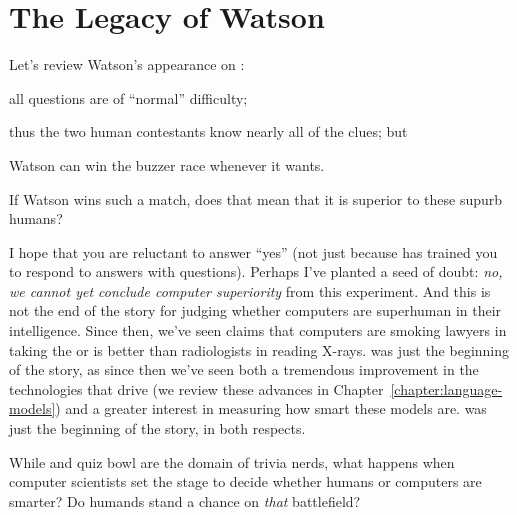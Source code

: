 
\section{The Legacy of Watson}


Let's review Watson's appearance on \jeopardy{}:
\begin{enumerate*}
        \item all questions are of ``normal'' difficulty;
        \item thus the two human contestants know nearly all of the clues; but
        \item Watson can win the buzzer race whenever it wants.
\end{enumerate*}
If Watson wins such a match, does that mean that it is superior to
these supurb humans?

I hope that you are reluctant to answer ``yes'' (not just
because \jeopardy{} has trained you to respond to answers with
questions).
%
Perhaps I've planted a seed of doubt: \emph{no, we cannot yet conclude
  computer superiority} from this experiment.
%
And this is not the end of the story for judging whether computers are
superhuman in their intelligence.
%
Since then, we've seen claims that computers are smoking lawyers in taking the
 or is better than radiologists in reading X-rays.
%
\watson{} was just the beginning of the story, as since then we've seen both a
tremendous improvement in the technologies that drive  (we review
these advances in Chapter~\ref{chapter:language-models}) and a greater
interest in measuring how smart these models are.
%
\watson{} was just the beginning of the story, in both respects.


While \jeopardy{} and quiz bowl are the domain of trivia nerds, what
happens when computer scientists set the stage to decide whether
humans or computers are smarter?
%
Do humands stand a chance on \emph{that} battlefield?
